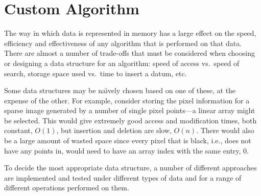 
\part{Custom Algorithm}
\label{prt:custom_algorithm}

The way in which data is represented in memory has a large effect on the speed,
efficiency and effectiveness of any algorithm that is performed on that data.
There are almost a number of trade-offs that must be considered when choosing
or designing a data structure for an algorithm: speed of access vs.\ speed of
search, storage space used vs.\ time to insert a datum, etc.

Some data structures may be na\"{\i}vely chosen based on one of these, at the
expense of the other. For example, consider storing the pixel information for a
sparse image generated by a number of single pixel points---a linear array
might be selected. This would give extremely good access and modification
times, both constant, $O(1)$, but insertion and deletion are slow, $O(n)$.
There would also be a large amount of wasted space since every pixel that is
black, i.e., does not have any points in, would need to have an array index
with the same entry, $0$.

To decide the most appropriate data structure, a number of different approaches
are implemented and tested under different types of data and for a range of
different operations performed on them.
